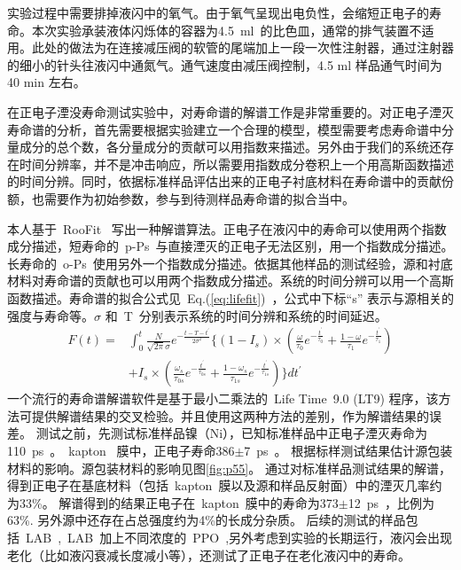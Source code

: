 实验过程中需要排掉液闪中的氧气。由于氧气呈现出电负性，会缩短正电子的寿命。本次实验承装液体闪烁体的容器为4.5~ml~的比色皿，通常的排气装置不适用。此处的做法为在连接减压阀的软管的尾端加上一段一次性注射器，通过注射器的细小的针头往液闪中通氮气。通气速度由减压阀控制，4.5 ml 样品通气时间为40 min 左右。

在正电子湮没寿命测试实验中，对寿命谱的解谱工作是非常重要的。对正电子湮灭寿命谱的分析，首先需要根据实验建立一个合理的模型，模型需要考虑寿命谱中分量成分的总个数，各分量成分的贡献可以用指数来描述。另外由于我们的系统还存在时间分辨率，并不是冲击响应，所以需要用指数成分卷积上一个用高斯函数描述的时间分辨。同时，依据标准样品评估出来的正电子衬底材料在寿命谱中的贡献份额，也需要作为初始参数，参与到待测样品寿命谱的拟合当中。

本人基于~RooFit~ 写出一种解谱算法。正电子在液闪中的寿命可以使用两个指数成分描述，短寿命的~p-Ps~与直接湮灭的正电子无法区别，用一个指数成分描述。长寿命的~o-Ps~使用另外一个指数成分描述。依据其他样品的测试经验，源和衬底材料对寿命谱的贡献也可以用两个指数成分描述。系统的时间分辨可以用一个高斯函数描述。寿命谱的拟合公式见~Eq.(\ref{eq:lifefit})~，公式中下标``s'' 表示与源相关的强度与寿命等。$\sigma$ 和~T~分别表示系统的时间分辨和系统的时间延迟。
\begin{eqnarray}
\label{eq:lifefit}
 F(t)=&\int_{0}^{t}\frac{N}{\sqrt{2\pi}\sigma}e^{-\frac{t-T-t^{\prime}}{2\sigma^2}}
\Big\{
     (1-I_s)\times (
    \frac{\omega}{\tau_{0}}e^{-\frac{t^{\prime}}{\tau_{0}}}+
    \frac{1-\omega}{\tau_{1}}e^{-\frac{t^{\prime}}{\tau_{1}}}
     )
 \nonumber \\
      &+I_s \times (
    \frac{\omega_s}{\tau_{0s}}e^{-\frac{t^{\prime}}{\tau_{0s}}}+
    \frac{1-\omega_s}{\tau_{1s}}e^{-\frac{t^{\prime}}{\tau_{1s}}}
     )
 \Big\}
 dt^{\prime}
\end{eqnarray}
一个流行的寿命谱解谱软件是基于最小二乘法的~Life Time~9.0 (LT9) 程序\citep{kansy1996microcomputer}，该方法可提供解谱结果的交叉检验。并且使用这两种方法的差别，作为解谱结果的误差。
测试之前，先测试标准样品镍（Ni），已知标准样品中正电子湮灭寿命为110~ps~\citep{zhang2015accurate}。~kapton~ 膜中，正电子寿命386$\pm$7~ps~\citep{plotkowski1988positron}。 根据标样测试结果估计源包装材料的影响。源包装材料的影响见图\ref{fig:p55}。 通过对标准样品测试结果的解谱，得到正电子在基底材料（包括~kapton~膜以及源和样品反射面）中的湮灭几率约为33\%。 解谱得到的结果正电子在~kapton~膜中的寿命为373$\pm$12~ps~，比例为63\%. 另外源中还存在占总强度约为4\%的长成分杂质。
后续的测试的样品包括~LAB~,~LAB~加上不同浓度的~PPO~,另外考虑到实验的长期运行，液闪会出现老化（比如液闪衰减长度减小等），还测试了正电子在老化液闪中的寿命。
